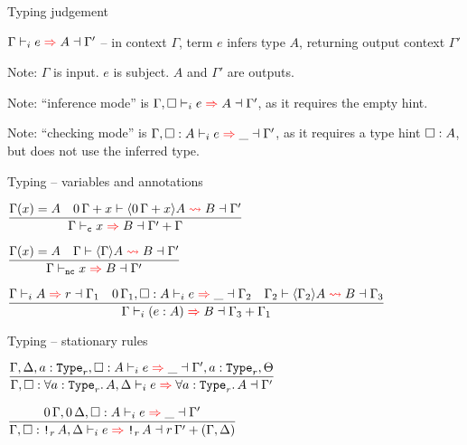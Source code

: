 \documentclass{beamer}
\begin{document}
\begin{frame}{Typing judgement}

$\infer{\Gamma}{e}{A}{\Gamma'}$ -- in context $\Gamma$, term $e$ infers type $A$, returning output context $\Gamma'$

\vspace{2em}

Note: $\Gamma$ is input. $e$ is subject. $A$ and $\Gamma'$ are outputs.

\vspace{2em}

Note: ``inference mode'' is $\infer{\Gamma, \emptyhint}{e}{A}{\Gamma'}$, as it requires the empty hint.

\vspace{2em}

Note: ``checking mode'' is $\infer{\Gamma, \typehint{A}}{e}{\_}{\Gamma'}$, as it requires a type hint $\square : A$, but does not use the inferred type.

\end{frame}

\begin{frame}{Typing -- variables and annotations}

\begin{center}
  $\infrule{\findvar{\Gamma}{x}{A} \quad \matching{\scalectx{\Zero}{\Gamma} + x}{\substctx{\scalectx{\Zero}{\Gamma} + x}{A}}{B}{\Gamma'}}{\infer{\Gamma}[\computable]{x}{B}{\addctx{\Gamma'}{\Gamma}}}$

  \vspace{2em}

  $\infrule{\findvar{\Gamma}{x}{A} \quad \matching{\Gamma}{\substctx{\Gamma}{A}}{B}{\Gamma'}}{\infer{\Gamma}[\noncomputable]{x}{B}{\Gamma'}}$

  \vspace{2em}

  $\infrule{\newinferkind{\Gamma}{A}{r}{\Gamma_1} \quad \infer{\scalectx{\Zero}{\Gamma_1}, \typehint{A}}{e}{\_}{\Gamma_2} \quad \matching{\Gamma_2}{\substctx{\Gamma_2}{A}}{B}{\Gamma_3}}{\infer{\Gamma}{\annot{e}{A}}{B}{\addctx{\Gamma_3}{\Gamma_1}}}$
\end{center}

\end{frame}

\begin{frame}{Typing -- stationary rules}

\begin{center}
  $\infrule{\infer{\Gamma, \Delta, \tvar{a}[r], \typehint{A}}{e}{\_}{\Gamma', \tvar{a}[r], \Theta}}{\infer{\Gamma, \typehint{\ForallI{a}[r]{A}}, \Delta}{e}{\ForallI{a}[r]{A}}{\Gamma'}}$

  \vspace{2em}

  $\infrule{\infer{\scalectx{\Zero}{\Gamma}, \scalectx{\Zero}{\Delta}, \typehint{A}}{e}{\_}{\Gamma'}}{\infer{\Gamma, \typehint{\Box[r]{A}}, \Delta}{e}{\Box[r]{A}}{\addctx{\scalectx{r}{\Gamma'}}{(\Gamma, \Delta)}}}$
\end{center}

\end{frame}
\end{document}
